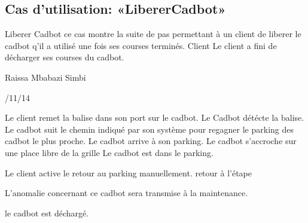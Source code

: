 \subsection{Cas d'utilisation: «LibererCadbot» }

\startCU
\nom Liberer Cadbot
\but  ce cas montre la suite de pas permettant à un client de liberer le cadbot q'il a utilisé une fois ses courses terminés.
\acteur Client
\precondition Le client a fini de décharger ses courses du cadbot.

\auteur Raissa Mbabazi Simbi
\date 7/11/14

\nominal %
\startnominal
\etape[SA1] Le client remet la balise dans son port sur le cadbot. 
\etape Le Cadbot détécte la balise.
\etape[RETOUR] Le cadbot suit le chemin indiqué par son système pour regagner le parking des cadbot le plus proche.
\etape Le cadbot arrive à son parking.
\etape Le cadbot s'accroche sur une place libre de la grille 
\stopnominal
\postcondition Le cadbot est dans le parking.

\alternatifs
\startalternatif[SA1] %
  \etape Le client active le retour au parking manuellement.
	\etape retour à l'étape \in[RETOUR]

\stopcondition
\postcondition L'anomalie concernant ce cadbot sera transmise à la maintenance.
\stopalternatif



\exception
le cadbot est déchargé.
\stopCU
